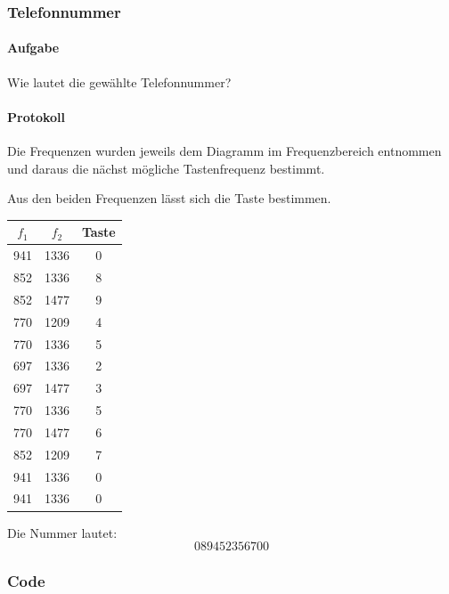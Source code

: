 \documentclass[10pt]{report}
\begin{document}
        \subsubsection{Telefonnummer}
        \paragraph{Aufgabe}
        Wie lautet die gewählte Telefonnummer?

        \paragraph{Protokoll}
        Die Frequenzen wurden jeweils dem Diagramm im Frequenzbereich entnommen
        und daraus die nächst mögliche Tastenfrequenz bestimmt.

        Aus den beiden Frequenzen lässt sich die Taste bestimmen.
        \begin{center}
            \begin{tabular}{ccc}
                \toprule
                $f_1$ & $f_2$ & Taste \\
                \midrule
                941 & 1336 & 0\\
                852 & 1336 & 8\\
                852 & 1477 & 9\\
                770 & 1209 & 4\\
                770 & 1336 & 5\\
                697 & 1336 & 2\\
                697 & 1477 & 3\\
                770 & 1336 & 5\\
                770 & 1477 & 6\\
                852 & 1209 & 7\\
                941 & 1336 & 0\\
                941 & 1336 & 0\\
                \bottomrule
            \end{tabular}
        \end{center}
        Die Nummer lautet:
        \begin{equation*}
            089452356700
        \end{equation*}



        \subsubsection{Code}
\end{document}
